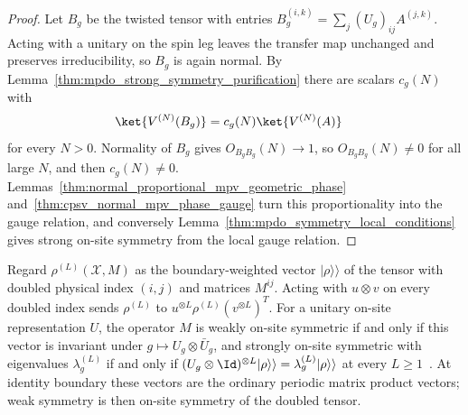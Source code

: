 \begin{proof}\leanok
    Let $B_g$ be the twisted tensor with entries
    $B_g^{(i,k)}=\sum_j(U_g)_{ij}A^{(j,k)}$. Acting with a unitary on the
    spin leg leaves the transfer map unchanged and preserves
    irreducibility, so $B_g$ is again normal. By
    Lemma~\ref{thm:mpdo_strong_symmetry_purification} there are scalars
    $c_g(N)$ with
    \begin{align}
        \ket{V^{(N)}(B_g)} & =c_g(N)\ket{V^{(N)}(A)}
        \notag
    \end{align}
    for every $N>0$. Normality of $B_g$ gives $O_{B_gB_g}(N)\to1$, so
    $O_{B_gB_g}(N)\neq0$ for all large $N$, and then $c_g(N)\neq0$.
    Lemmas~\ref{thm:normal_proportional_mpv_geometric_phase}
    and~\ref{thm:cpsv_normal_mpv_phase_gauge} turn this proportionality into
    the gauge relation, and conversely
    Lemma~\ref{thm:mpdo_symmetry_local_conditions} gives strong on-site
    symmetry from the local gauge relation.
\end{proof}

\begin{lemma}\label{thm:mpdo_symmetry_vectorized}
    \leanok
    Regard $\rho^{(L)}(\mathcal X,M)$ as the boundary-weighted
    vector $|\rho\rangle\rangle$ of the tensor with doubled physical index $(i,j)$ and matrices $M^{ij}$.
    Acting with $u\otimes v$ on every doubled index sends $\rho^{(L)}$ to
    $u^{\otimes L}\rho^{(L)}(v^{\otimes L})^T$. For a unitary on-site
    representation $U$, the operator $M$ is weakly on-site symmetric if and
    only if this vector is invariant under
    $g\mapsto U_g\otimes\bar U_g$, and strongly on-site symmetric with
    eigenvalues $\lambda_g^{(L)}$ if and only if
    $(U_g\otimes\Id)^{\otimes L}|\rho\rangle\rangle
        =\lambda_g^{(L)}|\rho\rangle\rangle$ at every $L\ge
        1$~\cite{GarreRubio2026LocalCharacterization}.
    At identity boundary these vectors are the ordinary periodic matrix
    product vectors; weak symmetry is then on-site symmetry of the doubled tensor.
\end{lemma}

